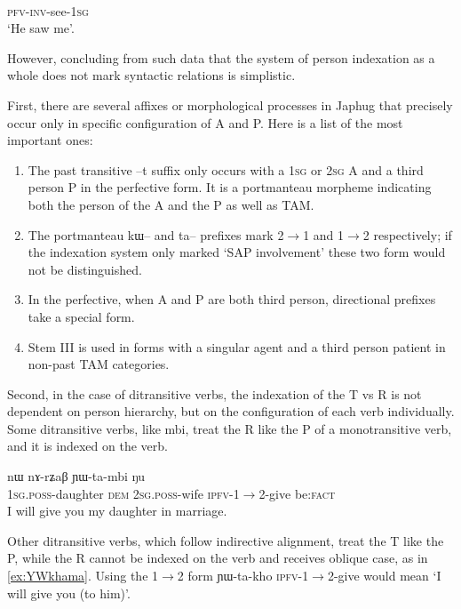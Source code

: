 \documentclass[oldfontcommands,oneside,a4paper,11pt]{article}
\newcommand{\ipa}[1]{{\phon \mbox{#1}}} %
\begin{document}
\begin{exe}
\ex \label{ex:pWwGmtoa}
\gll \ipa{pɯ́-wɣ-mto-a} \\
\textsc{pfv}-\textsc{inv}-see-\textsc{1sg} \\
\glt `He saw me'.
\end{exe}

However, concluding from such data that the system of person indexation as a whole does not mark syntactic relations is simplistic.

First, there are several affixes or morphological processes in Japhug that precisely occur only in specific configuration of A and P. Here is a list of the most important ones:

\begin{enumerate}
\item The past transitive \ipa{--t} suffix only occurs with a \textsc{1sg} or \textsc{2sg} A and a third person P in the perfective form. It is a portmanteau morpheme indicating both the person of the A and the P as well as TAM.
\item The portmanteau \ipa{kɯ--} and \ipa{ta--} prefixes mark 2$\rightarrow$1 and 1$\rightarrow$2 respectively; if the indexation system only marked `SAP involvement' these two form would not be distinguished.
\item In the perfective, when A and P are both third person, directional prefixes take a special form.
\item Stem III is used in forms with a singular agent and a third person patient in non-past TAM categories.
\end{enumerate}

Second, in the case of ditransitive verbs, the indexation of the T vs R is not dependent on person hierarchy, but on the configuration of each verb individually. Some ditransitive verbs, like \ipa{mbi}, treat the R like the P of a monotransitive verb, and it is indexed on the verb.

\begin{exe}
\ex \label{ex:YWtambi}
\gll \ipa{a-me} 	\ipa{nɯ} 	\ipa{nɤ-rʑaβ} 	\ipa{ɲɯ-ta-mbi} 	\ipa{ŋu} \\
\textsc{1sg.poss}-daughter \textsc{dem} \textsc{2sg.poss}-wife \textsc{ipfv}-1$\rightarrow$2-give be:\textsc{fact} \\
\glt I will give you my daughter in marriage.
\end{exe}

Other ditransitive verbs, which follow indirective alignment, treat the T like the P, while the R cannot be indexed on the verb and receives oblique case, as in \ref{ex:YWkhama}. Using the 1$\rightarrow$2 form \ipa{ɲɯ-ta-kho} \textsc{ipfv}-1$\rightarrow$2-give would mean `I will give you (to him)'.
\end{document}
